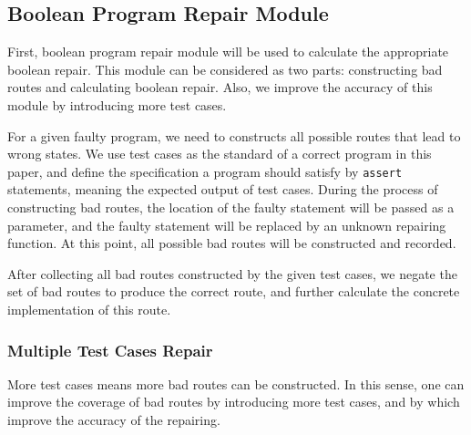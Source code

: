 \documentclass[10pt,journal,final,]{article}
\theoremstyle{definition}
\begin{document}
\subsection{Boolean Program Repair Module}
First, boolean program repair module will be used to calculate the appropriate boolean repair. This module can be considered as two parts: constructing bad routes and calculating boolean repair.
Also, we improve the accuracy of this module by introducing more test cases.

For a given faulty program, we need to constructs all possible routes that lead to wrong states.
We use test cases as the standard of a correct program in this paper, and define the specification a program should satisfy by \lstinline|assert| statements, meaning the expected output of test cases.
During the process of constructing bad routes, the location of the faulty statement will be passed as a parameter, and the faulty statement will be replaced by an unknown repairing function.
At this point, all possible bad routes will be constructed and recorded.

After collecting all bad routes constructed by the given test cases, we negate the set of bad routes to produce the correct route, and further calculate the concrete implementation of this route.

\subsubsection{Multiple Test Cases Repair}
\label{section:MultipleTestCasesRepair}
More test cases means more bad routes can be constructed. In this sense, one can improve the coverage of bad routes by introducing more test cases, and by which improve the accuracy of the repairing.
\end{document}
